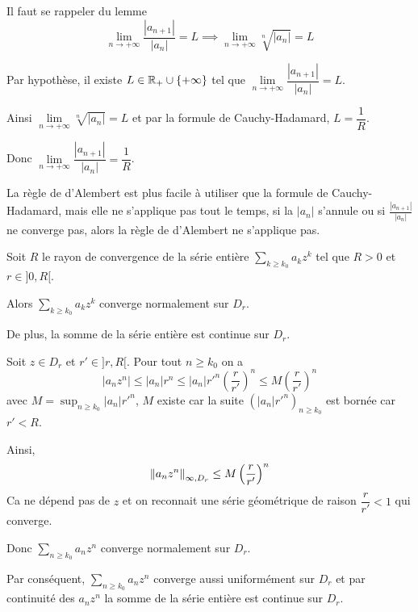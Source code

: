 \documentclass[a4paper, 12pt]{article}
\begin{document}
\begin{demonstration}
    Il faut se rappeler du lemme
    $$
    \lim_{n \to +\infty} \frac{|a_{n+1}|}{|a_n|} = L \implies \lim_{n \to +\infty} \sqrt[n]{|a_n|} = L
    $$

    Par hypothèse, il existe $L \in \mathbb{R}_+ \cup \{+\infty\}$ tel que $\lim\limits_{n \to +\infty} \dfrac{|a_{n+1}|}{|a_n|} = L$.

    Ainsi $\lim\limits_{n \to +\infty} \sqrt[n]{|a_n|} = L$ et par la formule de Cauchy-Hadamard, $L = \dfrac{1}{R}$.

    Donc $\lim\limits_{n \to +\infty} \dfrac{|a_{n+1}|}{|a_n|} = \dfrac{1}{R}$.
\end{demonstration}

\begin{remarque}
    La règle de d'Alembert est plus facile à utiliser que la formule de Cauchy-Hadamard,
    mais elle ne s'applique pas tout le temps, si la $|a_n|$ s'annule ou si $\frac{|a_{n+1}|}{|a_n|}$ ne converge pas,
    alors la règle de d'Alembert ne s'applique pas.    
\end{remarque}

\begin{proposition}{}{}
    Soit $R$ le rayon de convergence de la série entière $\sum\limits_{k \geq k_0} a_k z^k$ tel que $R > 0$ et $r \in ]0, R[$.

    \vspace{0.5cm}
    Alors $\sum\limits_{k \geq k_0} a_k z^k$ converge normalement sur $D_r$.

    De plus, la somme de la série entière est continue sur $D_r$.
\end{proposition}

\begin{demonstration}
    Soit $z \in D_r$ et $r' \in ]r, R[$.
    Pour tout $n \geq k_0$ on a
    $$
    |a_n z^n| \leq |a_n| r^n \leq |a_n| r'^n \left(\frac{r}{r'}\right)^n \leq M \left(\frac{r}{r'}\right)^n
    $$
    avec $M = \sup_{n \geq k_0} |a_n| r'^n$, $M$ existe car la suite $(|a_n| r'^n)_{n \geq k_0}$ est bornée car $r' < R$.
    
    Ainsi,
    $$
    \left\lVert a_n z^n\right\rVert_{\infty, D_r} \leq M \left(\frac{r}{r'}\right)^n
    $$
    Ca ne dépend pas de $z$ et on reconnait une série géométrique de raison $\dfrac{r}{r'} < 1$ qui converge.
    
    Donc $\sum\limits_{n \geq k_0} a_n z^n$ converge normalement sur $D_r$.

    Par conséquent, $\sum\limits_{n \geq k_0} a_n z^n$ converge aussi uniformément sur $D_r$
    et par continuité des $a_n z^n$ la somme de la série entière est continue sur $D_r$.
\end{demonstration}
\end{document}
